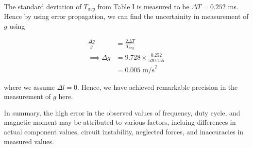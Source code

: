 The standard deviation of $T_{avg}$ from Table I is measured to be $\Delta T = 0.252$ ms. Hence by using error propagation, we can find the uncertainity in measurement of $g$ using 

\begin{align*}
    \frac{\Delta g}{g} &= \frac{2\Delta T}{T_{avg}}\\
    \implies \Delta g &= 9.728 \times \frac{0.252}{520.155}\\
    &= 0.005 \text{ m/s}^2
\end{align*}

where we assume $\Delta l = 0$. Hence, we have achieved remarkable precision in the measurement of $g$ here.


In summary, the high error in the observed values of frequency, duty cycle, and magnetic moment may be attributed to various factors, incluing differences in actual component values, circuit instability, neglected forces, and inaccuracies in measured values.